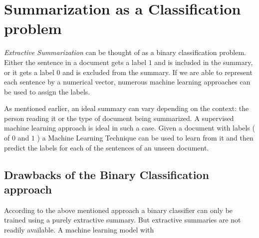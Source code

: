 \documentclass[paper=a4, fontsize=11pt]{scrartcl} %
\numberwithin{equation}{section} %
\numberwithin{figure}{section} %
\numberwithin{table}{section} %
\begin{document}

\section{Summarization as a Classification problem}
\emph{Extractive Summarization} can be thought of as a binary classification problem. Either the sentence in a document gets a label $1$ and is included in the summary, or it gets a label $0$ and is excluded from the summary. If we are able to represent each sentence by a numerical vector, numerous machine learning approaches can be used to assign the labels.
\\
\par
As mentioned earlier, an ideal summary can vary depending on the context: the person reading it or the type of document being summarized. A supervised machine learning approach is ideal in such a case. Given a document with labels ( of $0$ and $1$ ) a Machine Learning Technique can be used to learn from it and then predict the labels for each of the sentences of an unseen document. 

\subsection{Drawbacks of the Binary Classification approach}
According to the above mentioned approach a binary classifier can only be trained using a purely extractive summary. But extractive summaries are not readily available. A machine learning model with 

{}

\end{document}
